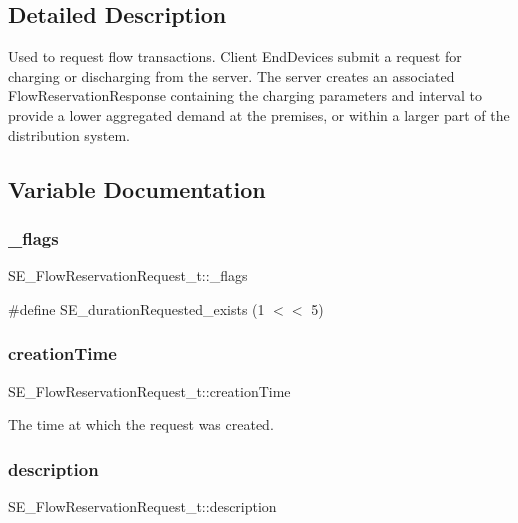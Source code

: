\subsection{Detailed Description}
Used to request flow transactions. Client End\+Devices submit a request for charging or discharging from the server. The server creates an associated Flow\+Reservation\+Response containing the charging parameters and interval to provide a lower aggregated demand at the premises, or within a larger part of the distribution system. 

\subsection{Variable Documentation}
\mbox{\label{group__FlowReservationRequest_ga0764d897ff608d7dbad85a6cb7aa89ba}} 
\subsubsection{\texorpdfstring{\+\_\+flags}{\_flags}}
{\footnotesize\ttfamily S\+E\+\_\+\+Flow\+Reservation\+Request\+\_\+t\+::\+\_\+flags}

\#define S\+E\+\_\+duration\+Requested\+\_\+exists (1 $<$$<$ 5) \mbox{\label{group__FlowReservationRequest_ga102e894f5430b9982cb9a6b8812a82eb}} 
\subsubsection{\texorpdfstring{creation\+Time}{creationTime}}
{\footnotesize\ttfamily S\+E\+\_\+\+Flow\+Reservation\+Request\+\_\+t\+::creation\+Time}

The time at which the request was created. \mbox{\label{group__FlowReservationRequest_gaa9f88864ccfb91a42dfd5f4961d69831}} 
\subsubsection{\texorpdfstring{description}{description}}
{\footnotesize\ttfamily S\+E\+\_\+\+Flow\+Reservation\+Request\+\_\+t\+::description}

